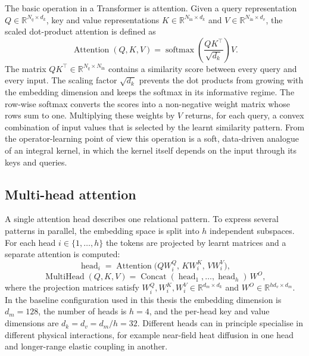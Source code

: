 The basic operation in a Transformer is attention. Given a query
representation \(Q\in\mathbb{R}^{N_q\times d_k}\), key and
value representations \(K\in\mathbb{R}^{N_{\mathrm{in}}\times d_k}\)
and \(V\in\mathbb{R}^{N_{\mathrm{in}}\times d_v}\), the
scaled dot-product attention is defined as
\begin{equation}
\operatorname{Attention}(Q,K,V) =
\operatorname{softmax}\!\left(
  \frac{QK^{\top}}{\sqrt{d_k}}
\right)V.
\label{eq:dotproduct}
\end{equation}
The matrix \(QK^{\top}\in\mathbb{R}^{N_q\times N_{\mathrm{in}}}\)
contains a similarity score between every query and every input. The
scaling factor \(\sqrt{d_k}\) prevents the dot products from growing
with the embedding dimension and keeps the softmax in its informative
regime. The row-wise softmax converts the scores into a non-negative
weight matrix whose rows sum to one. Multiplying these weights by
\(V\) returns, for each query, a convex combination of input
values that is selected by the learnt similarity pattern. From the
operator-learning point of view this operation is a soft, data-driven
analogue of an integral kernel, in which the kernel itself depends on
the input through its keys and queries.

\subsection{Multi-head attention}

A single attention head describes one relational pattern. To express
several patterns in parallel, the embedding space is split into
\(h\) independent subspaces. For each head \(i\in\{1,\dots,h\}\) the
tokens are projected by learnt matrices and a separate attention is
computed:
\begin{equation}
\operatorname{head}_i =
\operatorname{Attention}\!\big(
  QW^Q_i,\,
  KW^K_i,\,
  VW^V_i
\big),
\end{equation}
\begin{equation}
\operatorname{MultiHead}(Q,K,V) =
\operatorname{Concat}(\operatorname{head}_1,\dots,\operatorname{head}_h)\,W^O,
\end{equation}
where the projection matrices satisfy
\(W^Q_i,W^K_i,W^V_i\in\mathbb{R}^{d_m\times d_k}\)
and \(W^O\in\mathbb{R}^{h d_v\times d_m}\). In the baseline
configuration used in this thesis the embedding dimension is
\(d_m=128\), the number of heads is \(h=4\), and the per-head key and
value dimensions are \(d_k=d_v=d_m/h=32\). Different heads can in
principle specialise in different physical interactions, for example
near-field heat diffusion in one head and longer-range elastic
coupling in another.

